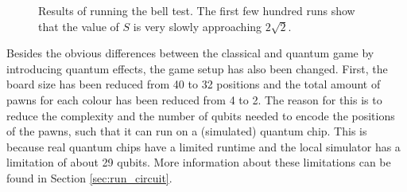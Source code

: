 \documentclass[final,5p,times,twocolumn,authoryear]{elsarticle}
\begin{document}
\begin{figure}
    \centering
    
    \caption{Results of running the bell test. The first few hundred runs show that the value of $S$ is very slowly approaching $2\sqrt{2}$.}
    \label{fig:bell_test_results}
\end{figure}



Besides the obvious differences between the classical and quantum game by introducing quantum effects, the game setup has also been changed. First, the board size has been reduced from 40 to 32 positions and the total amount of pawns for each colour has been reduced from 4 to 2. The reason for this is to reduce the complexity and the number of qubits needed to encode the positions of the pawns, such that it can run on a (simulated) quantum chip. This is because real quantum chips have a limited runtime and the local simulator has a limitation of about 29 qubits. More information about these limitations can be found in Section \ref{sec:run_circuit}. 
\end{document}
